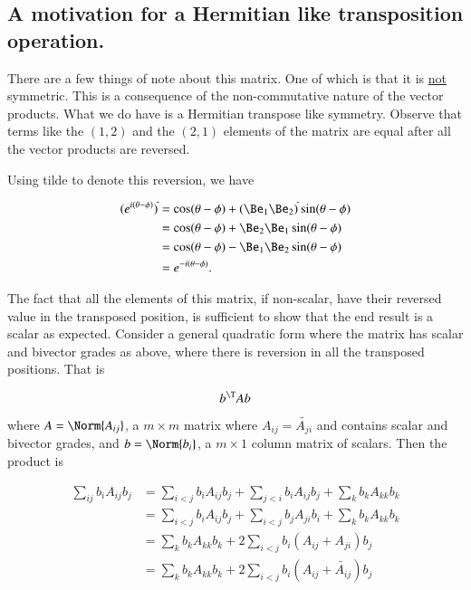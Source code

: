 \subsection{A motivation for a Hermitian like transposition operation.}

There are a few things of note about this matrix.  One of which is that it is \underline{not} symmetric.  This is a consequence of the non-commutative nature of the vector products.  What we do have is a Hermitian transpose like symmetry.  Observe that terms like the $(1,2)$ and the $(2,1)$ elements of the matrix are equal after all the vector products are reversed.

Using tilde to denote this reversion, we have

\begin{align*}
(e^{i (\theta - \phi)})^{\tilde{}}
&=
\cos(\theta - \phi)
+ (\Be_1 \Be_2)^{\tilde{}}
\sin(\theta - \phi) \\
&=
\cos(\theta - \phi)
+ \Be_2 \Be_1
\sin(\theta - \phi) \\
&=
\cos(\theta - \phi)
- \Be_1 \Be_2 
\sin(\theta - \phi) \\
&=
e^{-i (\theta -\phi)}.
\end{align*}

The fact that all the elements of this matrix, if non-scalar, have their reversed value in the transposed position, is sufficient to show that the end result is a scalar as expected.  Consider a general quadratic form where the matrix has scalar and bivector grades as above, where there is reversion in all the transposed positions.  That is

\begin{equation}\label{eqn:matrixVectorPotentials:90}
b^\T A b
\end{equation}

where $A = \Norm{A_{ij}}$, a $m \times m$ matrix where $A_{ij} = \tilde{A_{ji}}$ and contains scalar and bivector grades, and $b = \Norm{b_i}$, a $m\times 1$ column matrix of scalars.  Then the product is

\begin{align*}
\sum_{ij} b_i A_{ij} b_j
&=
\sum_{i<j} b_i A_{ij} b_j
+\sum_{j<i} b_i A_{ij} b_j
+\sum_{k} b_k A_{kk} b_k \\
&=
\sum_{i<j} b_i A_{ij} b_j
+\sum_{i<j} b_{j} A_{ji} b_i
+\sum_{k} b_k A_{kk} b_k \\
&=
\sum_{k} b_k A_{kk} b_k + 2 \sum_{i<j} b_i (A_{ij} + A_{ji}) b_j \\
&=
\sum_{k} b_k A_{kk} b_k + 2 \sum_{i<j} b_i (A_{ij} + \tilde{A_{ij}}) b_j
\end{align*}

